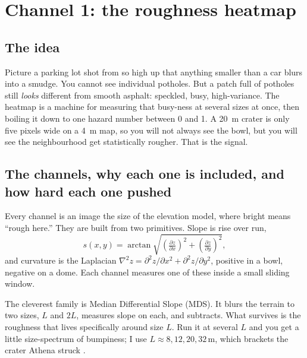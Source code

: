 \documentclass[11pt]{article}
\begin{document}
\section{Channel 1: the roughness heatmap}

\subsection{The idea}
\begin{plainbox}
Picture a parking lot shot from so high up that anything smaller than a car blurs
into a smudge. You cannot see individual potholes. But a patch full of potholes still
\emph{looks} different from smooth asphalt: speckled, busy, high-variance. The
heatmap is a machine for measuring that busy-ness at several sizes at once, then
boiling it down to one hazard number between 0 and 1. A \SI{20}{\meter} crater is
only five pixels wide on a \SI{4}{\meter} map, so you will not always see the bowl,
but you will see the neighbourhood get statistically rougher. That is the signal.
\end{plainbox}

\subsection{The channels, why each one is included, and how hard each one pushed}
\label{sec:channels}

Every channel is an image the size of the elevation model, where bright means
``rough here.'' They are built from two primitives. Slope is rise over run,
\begin{equation}
s(x,y)=\arctan\sqrt{\left(\tfrac{\partial z}{\partial x}\right)^2+\left(\tfrac{\partial z}{\partial y}\right)^2},
\label{eq:slope}
\end{equation}
and curvature is the Laplacian $\nabla^2 z=\partial^2 z/\partial x^2+\partial^2 z/\partial y^2$,
positive in a bowl, negative on a dome. Each channel measures one of these inside a
small sliding window.

The cleverest family is Median Differential Slope (MDS). It blurs the terrain to two
sizes, $L$ and $2L$, measures slope on each, and subtracts. What survives is the
roughness that lives specifically around size $L$. Run it at several $L$ and you get
a little size-spectrum of bumpiness; I use $L\approx 8,12,20,32\,\si{\meter}$, which
brackets the crater Athena struck \autocite{kreslavsky2000,rosenburg2011}.
\end{document}
